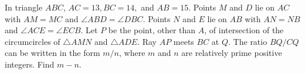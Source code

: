 %	













\begin{question}[name={2010 AIME II, \href{https://artofproblemsolving.com/community/c4p1831368}{Problem 15}}]
	In triangle $ ABC$, $ AC = 13, BC = 14,$ and $ AB=15$. Points $ M$ and $ D$ lie on $ AC$ with $ AM=MC$ and $ \angle ABD = \angle DBC$. Points $ N$ and $ E$ lie on $ AB$ with $ AN=NB$ and $ \angle ACE = \angle ECB$. Let $ P$ be the point, other than $ A$, of intersection of the circumcircles of $ \triangle AMN$ and $ \triangle ADE$. Ray $ AP$ meets $ BC$ at $ Q$. The ratio $ {BQ}/{CQ}$ can be written in the form ${m}/{n}$, where $ m$ and $ n$ are relatively prime positive integers. Find $ m-n$.
\end{question}


